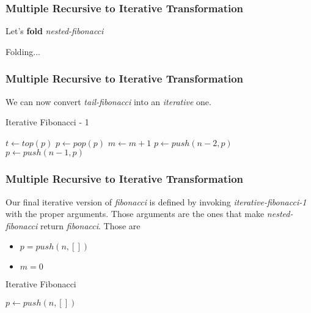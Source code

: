 \documentclass{beamer}
\begin{document}
\begin{frame}
	\frametitle{Multiple Recursive to Iterative Transformation}
	Let's \textbf{fold} \textit{nested-fibonacci}
	\begin{block}{Folding...}
		\tiny
		\begin{algorithmic}[1]
					\State{}
				\Else
						\State{}
					\Else
							\State{}
						\Else
							\State{}
						\EndIf
					\EndIf
				\EndIf
			\EndProcedure
		\end{algorithmic}
	\end{block}
\end{frame}
\begin{frame}
	\frametitle{Multiple Recursive to Iterative Transformation}
	We can now convert \textit{tail-fibonacci} into an \textit{iterative} one.
	\begin{block}{Iterative Fibonacci - 1}
		\begin{algorithmic}[1]
					\State $t \gets top(p)$
					\State $p \gets pop(p)$
						\State $m \gets m+1$
					\Else
						\State $p \gets push(n-2,p)$
						\State $p \gets push(n-1,p)$
					\EndIf
					\EndIf
				\EndWhile
				\State{}
			\EndProcedure
		\end{algorithmic}
	\end{block}
\end{frame}
\begin{frame}
	\frametitle{Multiple Recursive to Iterative Transformation}
	Our final iterative version of \textit{fibonacci} is defined by invoking \textit{iterative-fibonacci-1} with the proper arguments. Those arguments are the ones that make \textit{nested-fibonacci} return \textit{fibonacci}. Those are
	\begin{itemize}
		\item $p = push(n,[])$
		\item $m = 0$
	\end{itemize}
	\begin{block}{Iterative Fibonacci}
		\begin{algorithmic}[1]
				\State $p \gets push(n,[])$
				\State{}
			\EndProcedure
		\end{algorithmic}
	\end{block}
\end{frame}
\end{document}
